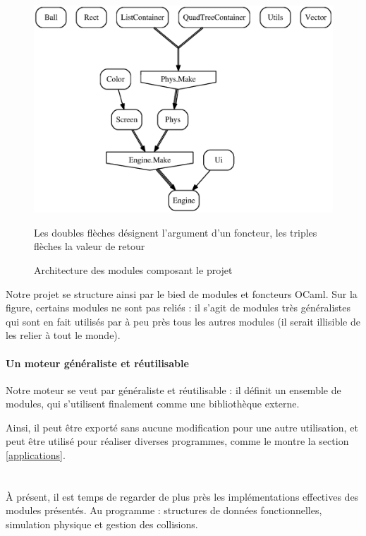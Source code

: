 \documentclass[a4paper]{scrartcl}
\begin{document}
\begin{figure}[h]
  \centering
  \includegraphics[scale = 0.7]{modules.eps}  
  \caption{Architecture des modules composant le projet}
  Les doubles flèches désignent l'argument d'un foncteur, les triples
  flèches la valeur de retour
  \label{fig:modules}
\end{figure}

Notre projet se structure ainsi par le bied de modules et foncteurs
OCaml. Sur la figure, certains modules ne sont pas reliés : il s'agit
de modules très généralistes qui sont en fait utilisés par à peu près
tous les autres modules (il serait illisible de les relier à tout le
monde).

\paragraph{Un moteur généraliste et réutilisable}

Notre moteur se veut par généraliste et réutilisable : il définit un
ensemble de modules, qui s'utilisent finalement comme une bibliothèque
externe.

Ainsi, il peut être exporté sans aucune modification pour une autre
utilisation, et peut être utilisé pour réaliser diverses programmes,
comme le montre la section \ref{applications}.

\section*{}
À présent, il est temps de regarder de plus près les implémentations
effectives des modules présentés. Au programme : structures de données
fonctionnelles, simulation physique et gestion des collisions.
\end{document}
